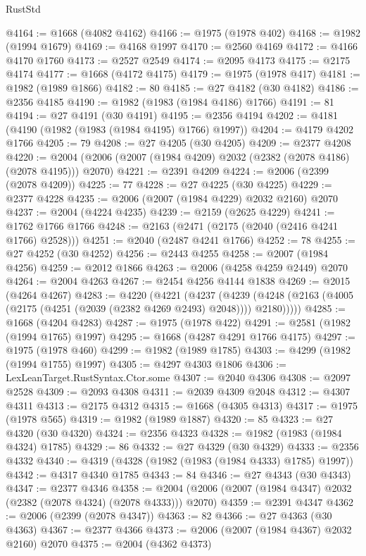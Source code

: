 \begin{lexlean}{RustStd}
\begin{coremodule}
@4164 := @1668 (@4082 @4162)
@4166 := @1975 (@1978 @402)
@4168 := @1982 (@1994 @1679)
@4169 := @4168 @1997
@4170 := @2560 @4169
@4172 := @4166 @4170 @1760
@4173 := @2527 @2549
@4174 := @2095 @4173
@4175 := @2175 @4174
@4177 := @1668 (@4172 @4175)
@4179 := @1975 (@1978 @417)
@4181 := @1982 (@1989 @1866)
@4182 := 80
@4185 := @27 @4182 (@30 @4182)
@4186 := @2356 @4185
@4190 := @1982 (@1983 (@1984 @4186) @1766)
@4191 := 81
@4194 := @27 @4191 (@30 @4191)
@4195 := @2356 @4194
@4202 := @4181 (@4190 (@1982 (@1983 (@1984 @4195) @1766) @1997))
@4204 := @4179 @4202 @1766
@4205 := 79
@4208 := @27 @4205 (@30 @4205)
@4209 := @2377 @4208
@4220 := @2004 (@2006 (@2007 (@1984 @4209) @2032 (@2382 (@2078 @4186) (@2078 @4195))) @2070)
@4221 := @2391 @4209
@4224 := @2006 (@2399 (@2078 @4209))
@4225 := 77
@4228 := @27 @4225 (@30 @4225)
@4229 := @2377 @4228
@4235 := @2006 (@2007 (@1984 @4229) @2032 @2160) @2070
@4237 := @2004 (@4224 @4235)
@4239 := @2159 (@2625 @4229)
@4241 := @1762 @1766 @1766
@4248 := @2163 (@2471 (@2175 (@2040 (@2416 @4241 @1766) @2528)))
@4251 := @2040 (@2487 @4241 @1766)
@4252 := 78
@4255 := @27 @4252 (@30 @4252)
@4256 := @2443 @4255
@4258 := @2007 (@1984 @4256)
@4259 := @2012 @1866
@4263 := @2006 (@4258 @4259 @2449) @2070
@4264 := @2004 @4263
@4267 := @2454 @4256 @4144 @1838
@4269 := @2015 (@4264 @4267)
@4283 := @4220
    (@4221
      (@4237
        (@4239 (@4248 (@2163 (@4005 (@2175 (@4251 (@2039 (@2382 @4269 @2493) @2048)))) @2180)))))
@4285 := @1668 (@4204 @4283)
@4287 := @1975 (@1978 @422)
@4291 := @2581 (@1982 (@1994 @1765) @1997)
@4295 := @1668 (@4287 @4291 @1766 @4175)
@4297 := @1975 (@1978 @460)
@4299 := @1982 (@1989 @1785)
@4303 := @4299 (@1982 (@1994 @1755) @1997)
@4305 := @4297 @4303 @1806
@4306 := LexLeanTarget.RustSyntax.Ctor.some
@4307 := @2040 @4306
@4308 := @2097 @2528
@4309 := @2093 @4308
@4311 := @2039 @4309 @2048
@4312 := @4307 @4311
@4313 := @2175 @4312
@4315 := @1668 (@4305 @4313)
@4317 := @1975 (@1978 @565)
@4319 := @1982 (@1989 @1887)
@4320 := 85
@4323 := @27 @4320 (@30 @4320)
@4324 := @2356 @4323
@4328 := @1982 (@1983 (@1984 @4324) @1785)
@4329 := 86
@4332 := @27 @4329 (@30 @4329)
@4333 := @2356 @4332
@4340 := @4319 (@4328 (@1982 (@1983 (@1984 @4333) @1785) @1997))
@4342 := @4317 @4340 @1785
@4343 := 84
@4346 := @27 @4343 (@30 @4343)
@4347 := @2377 @4346
@4358 := @2004 (@2006 (@2007 (@1984 @4347) @2032 (@2382 (@2078 @4324) (@2078 @4333))) @2070)
@4359 := @2391 @4347
@4362 := @2006 (@2399 (@2078 @4347))
@4363 := 82
@4366 := @27 @4363 (@30 @4363)
@4367 := @2377 @4366
@4373 := @2006 (@2007 (@1984 @4367) @2032 @2160) @2070
@4375 := @2004 (@4362 @4373)

\end{coremodule}
\end{lexlean}
